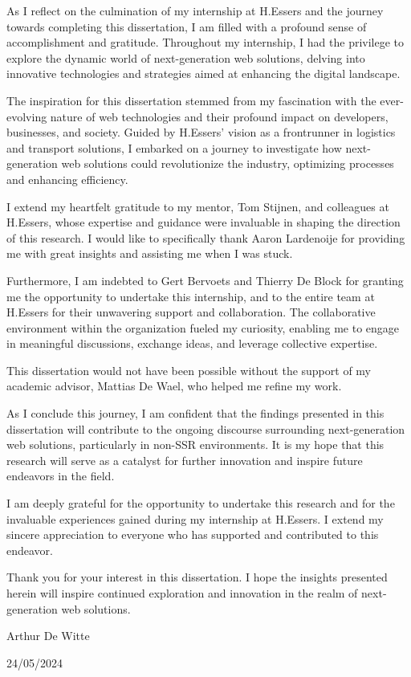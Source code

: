 
As I reflect on the culmination of my internship at H.Essers and the journey towards completing this dissertation, I am filled with a profound sense of accomplishment and gratitude. Throughout my internship, I had the privilege to explore the dynamic world of next-generation web solutions, delving into innovative technologies and strategies aimed at enhancing the digital landscape.

The inspiration for this dissertation stemmed from my fascination with the ever-evolving nature of web technologies and their profound impact on developers, businesses, and society. Guided by H.Essers' vision as a frontrunner in logistics and transport solutions, I embarked on a journey to investigate how next-generation web solutions could revolutionize the industry, optimizing processes and enhancing efficiency.

I extend my heartfelt gratitude to my mentor, Tom Stijnen, and colleagues at H.Essers, whose expertise and guidance were invaluable in shaping the direction of this research. I would like to specifically thank Aaron Lardenoije for providing me with great insights and assisting me when I was stuck.

Furthermore, I am indebted to Gert Bervoets and Thierry De Block for granting me the opportunity to undertake this internship, and to the entire team at H.Essers for their unwavering support and collaboration. The collaborative environment within the organization fueled my curiosity, enabling me to engage in meaningful discussions, exchange ideas, and leverage collective expertise.

This dissertation would not have been possible without the support of my academic advisor, Mattias De Wael, who helped me refine my work.

As I conclude this journey, I am confident that the findings presented in this dissertation will contribute to the ongoing discourse surrounding next-generation web solutions, particularly in non-SSR environments. It is my hope that this research will serve as a catalyst for further innovation and inspire future endeavors in the field.

I am deeply grateful for the opportunity to undertake this research and for the invaluable experiences gained during my internship at H.Essers. I extend my sincere appreciation to everyone who has supported and contributed to this endeavor.

Thank you for your interest in this dissertation. I hope the insights presented herein will inspire continued exploration and innovation in the realm of next-generation web solutions.

\vspace{2em}

Arthur De Witte

24/05/2024






